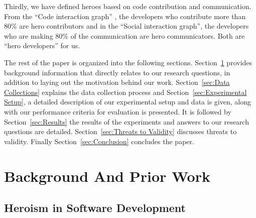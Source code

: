 \documentclass[smallextended]{svjour3}
\begin{document}
Thirdly, we have defined heroes based on code contribution and communication. From the ``Code interaction graph'' , the developers who contribute more than 80\% are hero contributors and in the ``Social interaction graph'', the developers who are making 80\% of the communication are hero communicators. Both are ``hero developers'' for us.

 


The rest of the paper is organized into the following sections. Section~\ref{sec:Background And Prior Work} provides background information that directly relates to our research questions, in addition to laying out the motivation behind our work. Section~\ref{sec:Data Collections} explains the data collection process and  Section~\ref{sec:Experimental Setup}, a detailed description of our experimental setup and data is given, along with our performance criteria for evaluation is presented. It is followed by Section~\ref{sec:Results} the results of the experiments and answers to our research questions are detailed. Section~\ref{sec:Threats to Validity} discusses threats to validity. Finally Section~\ref{sec:Conclusion} concludes the paper.



\section{Background And Prior Work }
\label{sec:Background And Prior Work}

\subsection{Heroism in Software Development}
\end{document}
